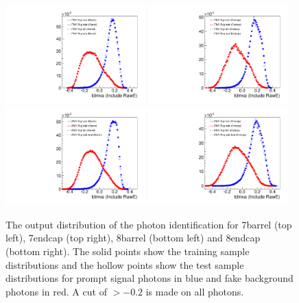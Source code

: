 \begin{figure}
  \includegraphics[width=0.48\textwidth]{selec_and_cats/plots/photonID_7TeV_barrel.pdf}
  \includegraphics[width=0.48\textwidth]{selec_and_cats/plots/photonID_7TeV_endcap.pdf} \\
  \includegraphics[width=0.48\textwidth]{selec_and_cats/plots/photonID_8TeV_barrel.pdf}
  \includegraphics[width=0.48\textwidth]{selec_and_cats/plots/photonID_8TeV_endcap.pdf}
  \caption{The output distribution of the photon identification \BDT for 7\TeV barrel (top left), 7\TeV endcap (top right), 8\TeV barrel (bottom left) and 8\TeV endcap (bottom right). The solid points show the \gjet training sample distributions and the hollow points show the \Hgg test sample distributions for prompt signal photons in blue and fake background photons in red. A cut of $>-0.2$ is made on all photons.}
  \label{fig:photon_id_bdt}
\end{figure}

